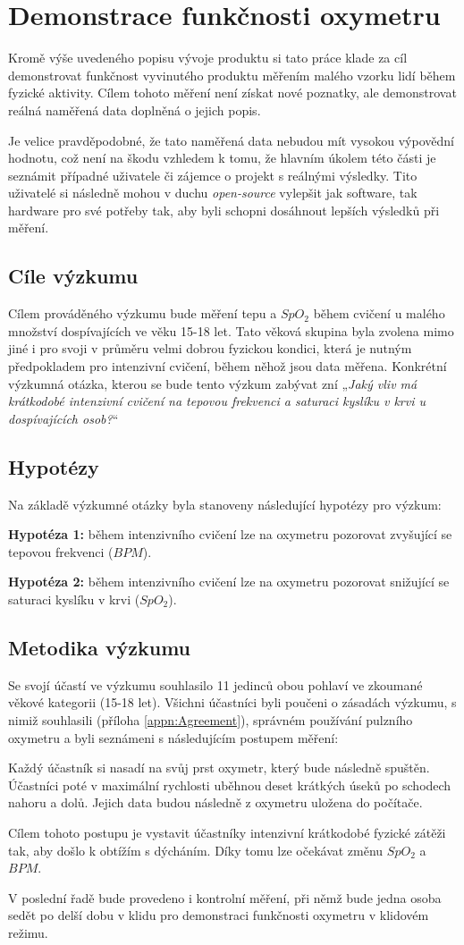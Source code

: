 \section{Demonstrace funkčnosti oxymetru}
Kromě výše uvedeného popisu vývoje produktu si tato práce klade za cíl demonstrovat funkčnost vyvinutého produktu měřením malého vzorku lidí během fyzické aktivity. Cílem tohoto měření není získat nové poznatky, ale demonstrovat reálná naměřená data doplněná o jejich popis.
\par Je velice pravděpodobné, že tato naměřená data nebudou mít vysokou výpovědní hodnotu, což není na škodu vzhledem k tomu, že hlavním úkolem této části je seznámit případné uživatele či zájemce o projekt s reálnými výsledky. Tito uživatelé si následně mohou v duchu \emph{open-source} vylepšit jak software, tak hardware pro své potřeby tak, aby byli schopni dosáhnout lepších výsledků při měření.
\subsection{Cíle výzkumu}
Cílem prováděného výzkumu bude měření tepu a $SpO_2$ během cvičení u malého množství dospívajících ve věku 15-18 let. Tato věková skupina byla zvolena mimo jiné i pro svoji v průměru velmi dobrou fyzickou kondici, která je nutným předpokladem pro intenzivní cvičení, během něhož jsou data měřena. Konkrétní výzkumná otázka, kterou se bude tento výzkum zabývat zní „\emph{Jaký vliv má krátkodobé intenzivní cvičení na tepovou frekvenci a saturaci kyslíku v krvi u dospívajících osob?}“
\subsection{Hypotézy}
Na základě výzkumné otázky byla stanoveny následující hypotézy pro výzkum:
\par\textbf{Hypotéza 1:} během intenzivního cvičení lze na oxymetru pozorovat zvyšující se tepovou frekvenci ($BPM$).
\par\textbf{Hypotéza 2:} během intenzivního cvičení lze na oxymetru pozorovat snižující se saturaci kyslíku v krvi ($SpO_2$).
\subsection{Metodika výzkumu}
Se svojí účastí ve výzkumu souhlasilo 11 jedinců obou pohlaví ve zkoumané věkové kategorii (15-18 let). Všichni účastníci byli poučeni o zásadách výzkumu, s nimiž souhlasili (příloha \ref{appn:Agreement}), správném používání pulzního oxymetru a byli seznámeni s následujícím postupem měření:
\par Každý účastník si nasadí na svůj prst oxymetr, který bude následně spuštěn. Účastníci poté v maximální rychlosti uběhnou deset krátkých úseků po schodech nahoru a dolů. Jejich data budou následně z oxymetru uložena do počítače.
\par Cílem tohoto postupu je vystavit účastníky intenzivní krátkodobé fyzické zátěži tak, aby došlo k obtížím s dýcháním. Díky tomu lze očekávat změnu $SpO_2$ a $BPM$.
\par V poslední řadě bude provedeno i kontrolní měření, při němž bude jedna osoba sedět po delší dobu v klidu pro demonstraci funkčnosti oxymetru v klidovém režimu.
